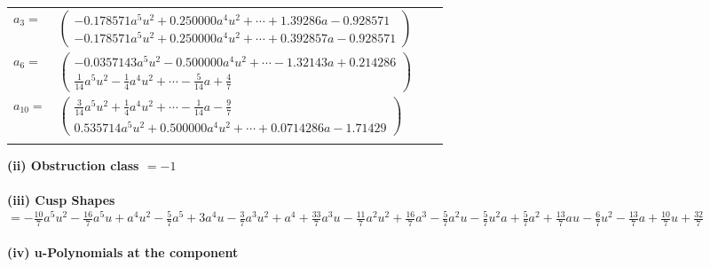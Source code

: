 \documentclass[1p]{elsarticle_modified}
\theoremstyle{definition}
\begin{document}
\begin{tabular}{m{7pt} m{180pt} m{7pt} m{180pt} }
\flushright $a_{3}=$&$\begin{pmatrix}-0.178571 a^{5} u^{2}+0.250000 a^{4} u^{2}+\cdots+1.39286 a-0.928571\\-0.178571 a^{5} u^{2}+0.250000 a^{4} u^{2}+\cdots+0.392857 a-0.928571\end{pmatrix}$ \\
\flushright $a_{6}=$&$\begin{pmatrix}-0.0357143 a^{5} u^{2}-0.500000 a^{4} u^{2}+\cdots-1.32143 a+0.214286\\\frac{1}{14} a^5 u^2-\frac{1}{4} a^4 u^2+\cdots-\frac{5}{14} a+\frac{4}{7}\end{pmatrix}$ \\
\flushright $a_{10}=$&$\begin{pmatrix}\frac{3}{14} a^5 u^2+\frac{1}{4} a^4 u^2+\cdots-\frac{1}{14} a-\frac{9}{7}\\0.535714 a^{5} u^{2}+0.500000 a^{4} u^{2}+\cdots+0.0714286 a-1.71429\end{pmatrix}$\\&\end{tabular}
\flushleft \textbf{(ii) Obstruction class $= -1$}\\~\\
\flushleft \textbf{(iii) Cusp Shapes $= -\frac{10}{7} a^5 u^2-\frac{16}{7} a^5 u+a^4 u^2-\frac{5}{7} a^5+3 a^4 u-\frac{3}{7} a^3 u^2+a^4+\frac{33}{7} a^3 u-\frac{11}{7} a^2 u^2+\frac{16}{7} a^3-\frac{5}{7} a^2 u-\frac{5}{7} u^2 a+\frac{5}{7} a^2+\frac{13}{7} a u-\frac{6}{7} u^2-\frac{13}{7} a+\frac{10}{7} u+\frac{32}{7}$}\\~\\
\newpage\renewcommand{\arraystretch}{1}
\flushleft \textbf{(iv) u-Polynomials at the component}\newline \\
\end{document}
